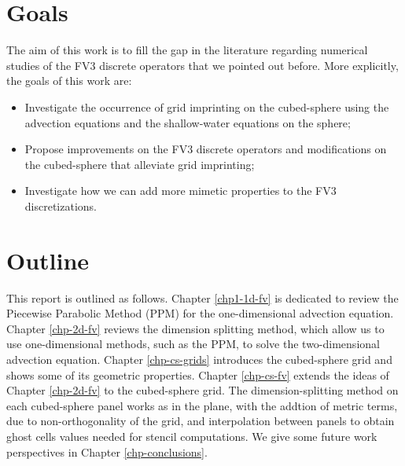 \section{Goals}
The aim of this work is to fill the gap in the literature regarding numerical studies of the FV3 
discrete operators that we pointed out before.
More explicitly, the goals of this work are:
\begin{itemize}
  \item Investigate the occurrence of grid imprinting on the cubed-sphere using the advection equations and
    the shallow-water equations on the sphere;
  \item Propose improvements on the FV3 discrete operators and modifications on the cubed-sphere that alleviate
    grid imprinting;
  \item Investigate how we can add more mimetic properties to the FV3 discretizations.
\end{itemize}

\section{Outline}
This report is outlined as follows.
Chapter \ref{chp1-1d-fv} is dedicated to review the Piecewise Parabolic Method (PPM)
for the one-dimensional advection equation. 
Chapter \ref{chp-2d-fv} reviews the dimension splitting method, which allow us to use 
one-dimensional methods, such as the PPM, to solve the two-dimensional advection equation.
Chapter \ref{chp-cs-grids} introduces the cubed-sphere grid and shows some of its geometric 
properties.
Chapter \ref{chp-cs-fv} extends the ideas of Chapter \ref{chp-2d-fv} to the cubed-sphere grid.
The dimension-splitting method on each cubed-sphere panel works as in the plane, with the addtion
of metric terms, due to non-orthogonality of the grid, and interpolation between panels
to obtain ghost cells values needed for stencil computations. 
We give some future work perspectives in Chapter \ref{chp-conclusions}.
